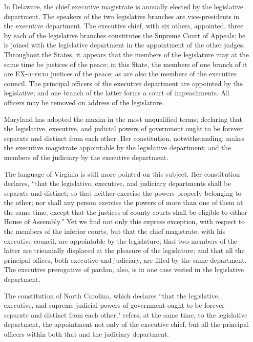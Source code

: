 In Delaware, the chief executive magistrate is annually elected by the legislative department. 
The speakers of the two legislative branches are vice-presidents in the executive department. 
The executive chief, with six others, appointed, three by each of the legislative branches constitutes the Supreme Court of Appeals; he is joined with the legislative department in the appointment of the other judges. 
Throughout the States, it appears that the members of the legislature may at the same time be justices of the peace; in this State, the members of one branch of it are EX-\textsc{officio} justices of the peace; as are also the members of the executive council. 
The principal officers of the executive department are appointed by the legislative; and one branch of the latter forms a court of impeachments. 
All officers may be removed on address of the legislature.

Maryland has adopted the maxim in the most unqualified terms; declaring that the legislative, executive, and judicial powers of government ought to be forever separate and distinct from each other. 
Her constitution, notwithstanding, makes the executive magistrate appointable by the legislative department; and the members of the judiciary by the executive department.

The language of Virginia is still more pointed on this subject. 
Her constitution declares, ``that the legislative, executive, and judiciary departments shall be separate and distinct; so that neither exercise the powers properly belonging to the other; nor shall any person exercise the powers of more than one of them at the same time, except that the justices of county courts shall be eligible to either House of Assembly." Yet we find not only this express exception, with respect to the members of the inferior courts, but that the chief magistrate, with his executive council, are appointable by the legislature; that two members of the latter are triennially displaced at the pleasure of the legislature; and that all the principal offices, both executive and judiciary, are filled by the same department. 
The executive prerogative of pardon, also, is in one case vested in the legislative department.

The constitution of North Carolina, which declares ``that the legislative, executive, and supreme judicial powers of government ought to be forever separate and distinct from each other," refers, at the same time, to the legislative department, the appointment not only of the executive chief, but all the principal officers within both that and the judiciary department.

